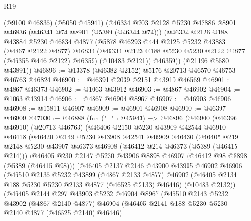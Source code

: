\begin{lexlean}{R19}
\begin{coremodule}
      (@9100 @46836)
      (@5050 @45941)
      (@46334
        @203
        @2128
        @5230
        @43886
        @8901
        @46836
        (@46341 @74 @8901 (@5389 (@46344 @74)))
        (@46334
          @2126
          @188
          @43884
          @5230
          @46834
          @4877
          (@5878
            @46293
            @444
            @2125
            @5232
            @43883
            (@4867 @2122 @4877)
            @46834
            (@46334 @2123 @188 @5230 @5230 @2122 @4877 (@46355 @446 @2122) @46359)
            (@10483 @2121))
          @46359))
      (@21196 @5580 @43891))
@46896 := @13378 (@46382 @2152) @5176 @20713 @46570 @46753 @46763 @46824
@46900 := @46391 @2039 @2151 @43910 @46569
@46901 := @4867 @46373
@46902 := @1063 @43912
@46903 := @4867 @46902
@46904 := @1063 @43914
@46906 := @4867 @46904 @8967
@46907 := @46903 @46906
@46908 := @15811 @46907
@46909 := @46901 @46908
@46910 := @46397 @46909
@47030 := @46888
    (fun ("_" : @45943) =>
    @46896
      (@46900
        (@46396 @46910)
        (@20713 @46763)
        (@46406
          @2150
          @5230
          @43909
          @42544
          @46910
          @46418
          (@46420
            @2149
            @5230
            @43908
            @42541
            @46909
            @46430
            (@46405
              @219
              @2148
              @5230
              @43907
              @46373
              @46908
              (@46412 @214 @46373 (@5389 (@46415 @214)))
              (@46405
                @230
                @2147
                @5230
                @43906
                @8898
                @46907
                (@46412 @98 @8898 (@5389 (@46415 @98)))
                (@46405
                  @2137
                  @2146
                  @43900
                  @43905
                  @46902
                  @46906
                  (@46510
                    @2136
                    @5232
                    @43899
                    (@4867 @2133 @4877)
                    @46902
                    (@46405 @2134 @188 @5230 @5230 @2133 @4877 (@46525 @2133) @46446)
                    (@10483 @2132))
                  (@46405
                    @2144
                    @297
                    @43903
                    @5232
                    @46904
                    @8967
                    (@46510
                      @2143
                      @5232
                      @43902
                      (@4867 @2140 @4877)
                      @46904
                      (@46405 @2141 @188 @5230 @5230 @2140 @4877 (@46525 @2140) @46446)

\end{coremodule}
\end{lexlean}
